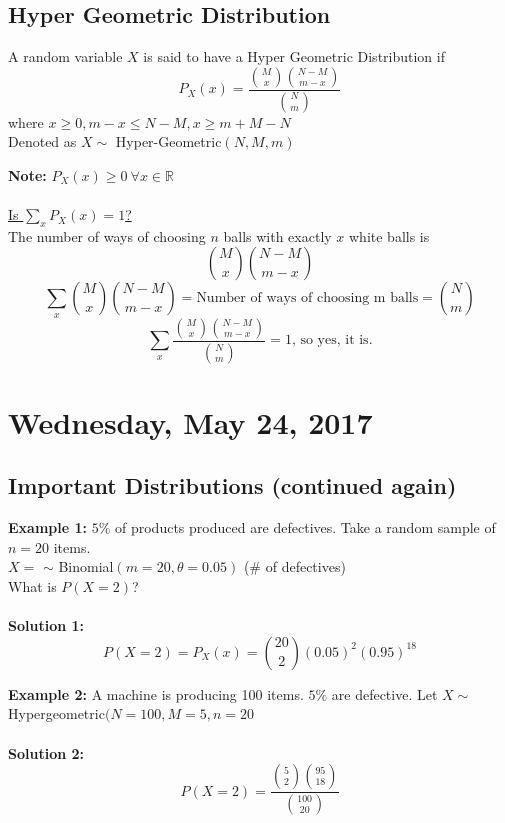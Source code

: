\documentclass[12pt]{article}
\begin{document}
\subsection{Hyper Geometric Distribution}
\begin{tcolorbox}[title=Definition: Hyper Geometric Distribution]
	A random variable $X$ is said to have a Hyper Geometric Distribution if
	$$P_X (x) = \frac{\binom{M}{x} \binom{N-M}{m-x}}{\binom{N}{m}}$$
	where $x \geq 0, m-x \leq N-M, x \geq m + M - N$\\
	Denoted as $X\sim$ Hyper-Geometric$(N,M,m)$
\end{tcolorbox}

\textbf{Note: } $P_X (x) \geq 0 \: \forall x\in\mathbb{R}$\\
\\
\underline{Is $\sum_x P_X (x) = 1$?}\\
The number of ways of choosing $n$ balls with exactly $x$ white balls is
$$\binom{M}{x}\binom{N-M}{m-x}$$
$$\sum_x \binom{M}{x}\binom{N-M}{m-x} = \text{Number of ways of choosing m balls} = \binom{N}{m}$$
$$\sum_x \frac{\binom{M}{x}\binom{N-M}{m-x}}{\binom{N}{m}} = 1 \text{, so yes, it is.}$$



\newpage

\section{Wednesday, May 24, 2017}

\subsection{Important Distributions (continued again)}

\textbf{Example 1:} $5\%$ of products produced are defectives. Take a random sample of $n = 20$ items.\\
$X = $ $\sim$ Binomial$(m = 20, \theta = 0.05)$  (\# of defectives)\\
What is $P(X = 2)$?\\
\\
\textbf{Solution 1:} $$P(X = 2) = P_X (x) = \binom{20}{2} (0.05)^2 (0.95)^{18}$$

\textbf{Example 2:} A machine is producing 100 items. $5\%$ are defective. Let $X \sim $ Hypergeometric$(N = 100, M = 5, n = 20$\\
\\
\textbf{Solution 2:} $$P(X = 2) = \frac{\binom{5}{2} \binom{95}{18}}{ \binom{100}{20}}$$
\end{document}
